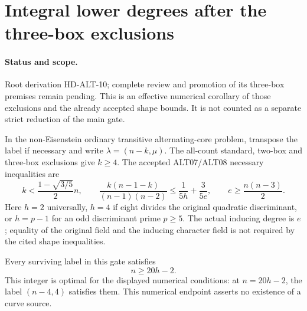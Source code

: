 \section{Integral lower degrees after the three-box exclusions}
\label{sec:alternating-four-tail-integral-cutoffs}

\paragraph{Status and scope.}
Root derivation HD-ALT-10; complete review and promotion of its
three-box premises remain pending. This is an effective numerical
corollary of those exclusions and the already accepted shape bounds.
It is not counted as a separate strict reduction of the main gate.

In the non-Eisenstein ordinary transitive alternating-core problem,
transpose the label if necessary and write $\lambda=(n-k,\mu)$.
The all-count standard, two-box and three-box exclusions give $k\ge4$.
The accepted ALT07/ALT08 necessary inequalities are
\[
 k<\frac{1-\sqrt{3/5}}2n,\qquad
 \frac{k(n-1-k)}{(n-1)(n-2)}
       \le\frac1{5h}+\frac3{5e},\qquad
 e\ge\frac{n(n-3)}2.                                  \tag{ALT10.1}
\]
Here $h=2$ universally, $h=4$ if eight divides the original
quadratic discriminant, or $h=p-1$ for an odd discriminant
prime $p\ge5$. The actual inducing degree is $e$; equality
of the original field and the inducing character field is
not required by the cited shape inequalities.

\begin{corollary}[HD-ALT-10]
Every surviving label in this gate satisfies
\[
                              n\ge20h-2.                \tag{ALT10.2}
\]
This integer is optimal for the displayed numerical conditions:
at $n=20h-2$, the label $(n-4,4)$ satisfies them. This
numerical endpoint asserts no existence of a curve source.
\end{corollary}

